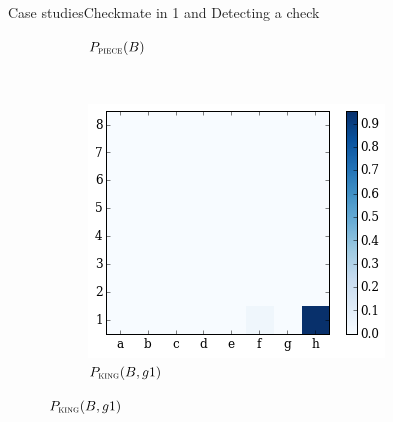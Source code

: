 \documentclass[9pt, unknownkeysallowed]{beamer}
\begin{document}
\begin{frame}{Case studies}{Checkmate in 1 and Detecting a check}
\begin{figure}[H]
\begin{subfigure}[t]{0.3\textwidth}
        \caption{$P_{\textsc{piece}}(B)$}
    \end{subfigure}
    ~
  \centering
    \begin{subfigure}[t]{0.3\textwidth}
        \centering
        \includegraphics[width=\textwidth]{../img/best_moves/output_24_6.png}
        \caption{$P_{\textsc{king}}(B, g1)$}
    \end{subfigure}
\label{figure:check-detection}
\end{figure}

 
\end{frame}
\end{document}

